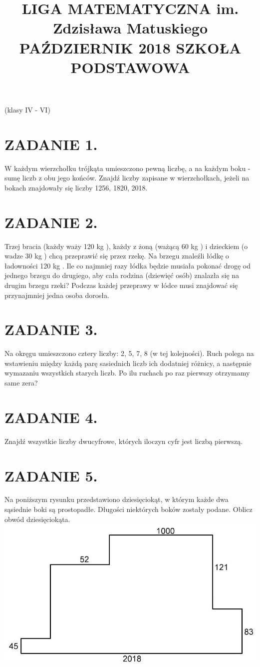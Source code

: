\documentclass[10pt]{article}
\title{LIGA MATEMATYCZNA im. Zdzisława Matuskiego PAŹDZIERNIK 2018 SZKOŁA PODSTAWOWA }
\author{}
\date{}
\begin{document}
\maketitle
(klasy IV - VI)

\section*{ZADANIE 1.}
W każdym wierzchołku trójkąta umieszczono pewną liczbę, a na każdym boku - sumę liczb z obu jego końców. Znajdź liczby zapisane w wierzchołkach, jeżeli na bokach znajdowały się liczby 1256, 1820, 2018.

\section*{ZADANIE 2.}
Trzej bracia (każdy waży 120 kg ), każdy z żoną (ważącą 60 kg ) i dzieckiem (o wadze 30 kg ) chcą przeprawić się przez rzekę. Na brzegu znaleźli łódkę o ładowności 120 kg . Ile co najmniej razy łódka będzie musiała pokonać drogę od jednego brzegu do drugiego, aby cała rodzina (dziewięć osób) znalazła się na drugim brzegu rzeki? Podczas każdej przeprawy w łódce musi znajdować się przynajmniej jedna osoba dorosła.

\section*{ZADANIE 3.}
Na okręgu umieszczono cztery liczby: 2, 5, 7, 8 (w tej kolejności). Ruch polega na wstawieniu między każdą parę sasiednich liczb ich dodatniej różnicy, a następnie wymazaniu wszystkich starych liczb. Po ilu ruchach po raz pierwszy otrzymamy same zera?

\section*{ZADANIE 4.}
Znajdź wszystkie liczby dwucyfrowe, których iloczyn cyfr jest liczbą pierwszą.

\section*{ZADANIE 5.}
Na poniższym rysunku przedstawiono dziesięciokąt, w którym każde dwa sąsiednie boki są prostopadłe. Długości niektórych boków zostały podane. Oblicz obwód dziesięciokąta.\\
\includegraphics[max width=\textwidth, center]{2024_11_21_7684d66c1edfbb46e8eeg-1}
\end{document}
